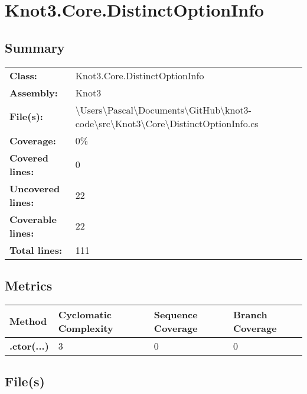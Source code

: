 \documentclass[a4paper,10pt]{article}
\begin{document}
\section{Knot3.Core.DistinctOptionInfo}
\subsection{Summary}
\begin{longtable}[l]{ll}
\textbf{Class:} & Knot3.Core.DistinctOptionInfo\\
\textbf{Assembly:} & Knot3\\
\textbf{File(s):} & \begin{minipage}[t]{12cm}{\textbackslash Users\textbackslash Pascal\textbackslash Documents\textbackslash GitHub\textbackslash knot3-code\textbackslash src\textbackslash Knot3\textbackslash Core\textbackslash DistinctOptionInfo.cs}\end{minipage} \\
\textbf{Coverage:} & 0\%\\
\textbf{Covered lines:} & 0\\
\textbf{Uncovered lines:} & 22\\
\textbf{Coverable lines:} & 22\\
\textbf{Total lines:} & 111\\
\end{longtable}
\subsection{Metrics}
\begin{longtable}[l]{|l|l|l|l|}
\hline
\textbf{Method} & \textbf{Cyclomatic Complexity} & \textbf{Sequence Coverage} & \textbf{Branch Coverage}\\
\hline
\textbf{.ctor(...)} & 3 & 0 & 0\\
\hline
\end{longtable}
\subsection{File(s)}
\end{document}
